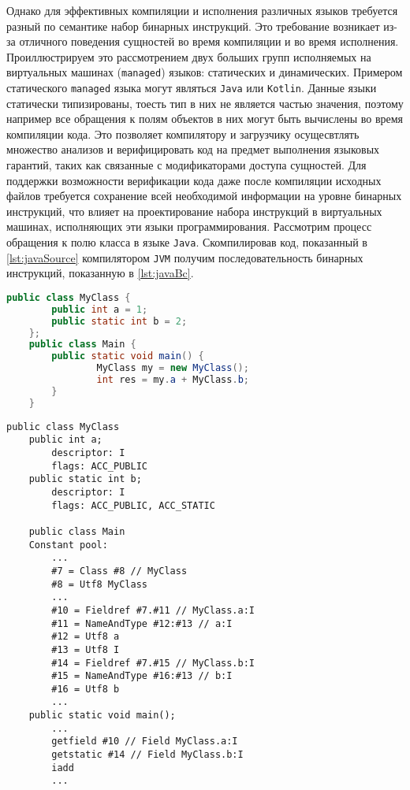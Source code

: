 Однако для эффективных компиляции и исполнения различных языков требуется разный по семантике набор бинарных инструкций. Это требование возникает из-за отличного поведения сущностей во время компиляции и во время исполнения. Проиллюстрируем это рассмотрением двух больших групп исполняемых на виртуальных машинах (\texttt{managed}) языков: статических и динамических. Примером статического \texttt{managed} языка могут являться \texttt{Java} или \texttt{Kotlin}. Данные языки статически типизированы, тоесть тип в них не является частью значения, поэтому например все обращения к полям объектов в них могут быть вычислены во время компиляции кода. Это позволяет компилятору и загрузчику осущесвтлять множество анализов и верифицировать код на предмет выполнения языковых гарантий, таких как связанные с модификаторами доступа сущностей. Для поддержки возможности верификации кода даже после компиляции исходных файлов требуется сохранение всей необходимой информации на уровне бинарных инструкций, что влияет на проектирование набора инструкций в виртуальных машинах, исполняющих эти языки программирования. Рассмотрим процесс обращения к полю класса в языке \texttt{Java}. Скомпилировав код, показанный в \autoref{lst:javaSource} компилятором \texttt{JVM} получим последовательность бинарных инструкций, показанную в \autoref{lst:javaBc}.

\begin{lstlisting}[language=Java, caption=Исходный код языка \texttt{Java}., label=lst:javaSource]
    public class MyClass {
        public int a = 1;
        public static int b = 2;
    };
    public class Main {
        public static void main() {
                MyClass my = new MyClass();
                int res = my.a + MyClass.b;
        }
    }
\end{lstlisting}

\begin{lstlisting}[caption=Бинарный код виртуальной машины \texttt{JVM}., label=lst:javaBc]
    public class MyClass
    public int a;
        descriptor: I
        flags: ACC_PUBLIC
    public static int b;
        descriptor: I
        flags: ACC_PUBLIC, ACC_STATIC

    public class Main
    Constant pool:
        ...
        #7 = Class #8 // MyClass
        #8 = Utf8 MyClass
        ...
        #10 = Fieldref #7.#11 // MyClass.a:I
        #11 = NameAndType #12:#13 // a:I
        #12 = Utf8 a
        #13 = Utf8 I
        #14 = Fieldref #7.#15 // MyClass.b:I
        #15 = NameAndType #16:#13 // b:I
        #16 = Utf8 b
        ...
    public static void main();
        ...
        getfield #10 // Field MyClass.a:I
        getstatic #14 // Field MyClass.b:I
        iadd
        ...
\end{lstlisting}

